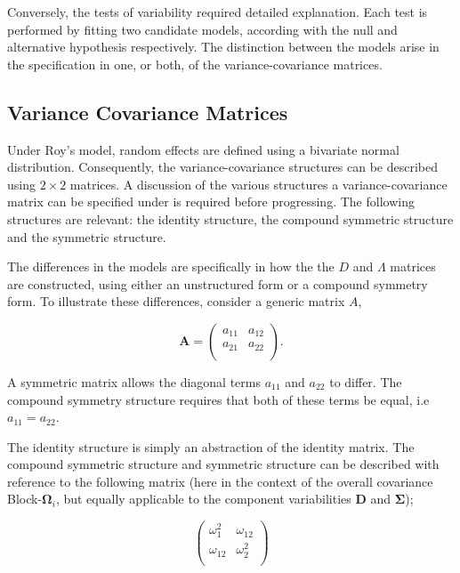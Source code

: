 \documentclass[12pt, a4paper]{report}
\theoremstyle{plain}
\theoremstyle{definition}
\theoremstyle{remark}
\begin{document}
	Conversely, the tests of variability required detailed explanation. Each test is performed by fitting two candidate models, according with the null and alternative hypothesis respectively. The distinction between the models arise in the specification in one, or both, of the variance-covariance matrices. %
	
	
	\subsection{Variance Covariance Matrices }
	
	Under Roy's model, random effects are defined using a bivariate normal distribution. Consequently, the variance-covariance structures can be described using $2 \times 2$  matrices. A discussion of the various structures a variance-covariance matrix can be specified under is required before progressing. The following structures are relevant: the identity structure, the compound symmetric structure and the symmetric structure.
	
	The differences in the models are specifically in how the the $D$ and $\Lambda$ matrices are constructed, using either an unstructured form or a compound symmetry form. To illustrate these differences, consider a generic matrix $A$,
	
	\[
	\boldsymbol{A} = \left( \begin{array}{cc}
	a_{11} & a_{12}  \\
	a_{21} & a_{22}  \\
	\end{array}\right).
	\]
	
	A symmetric matrix allows the diagonal terms $a_{11}$ and $a_{22}$ to differ. The compound symmetry structure requires that both of these terms be equal, i.e $a_{11} = a_{22}$.
	
	
	The identity structure is simply an abstraction of the identity matrix. The compound symmetric structure and symmetric structure can be described with reference to the following matrix (here in the context of the overall covariance Block-$\boldsymbol{\Omega}_i$, but equally applicable to the component variabilities $\boldsymbol{D}$ and $\boldsymbol{\Sigma}$);
	
	\[\left( \begin{array}{cc}
	\omega^2_1  & \omega_{12} \\
	\omega_{12} & \omega^2_2 \\
	\end{array}\right) \]
	
\end{document}
